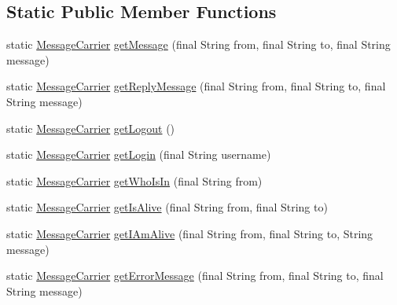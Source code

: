 \subsection*{Static Public Member Functions}
\begin{DoxyCompactItemize}
\item 
static \hyperlink{classgov_1_1fnal_1_1ppd_1_1dd_1_1chat_1_1MessageCarrier}{Message\-Carrier} \hyperlink{classgov_1_1fnal_1_1ppd_1_1dd_1_1chat_1_1MessageCarrier_a4c4efc24412a6390b9ddc6a002c42855}{get\-Message} (final String from, final String to, final String message)
\item 
static \hyperlink{classgov_1_1fnal_1_1ppd_1_1dd_1_1chat_1_1MessageCarrier}{Message\-Carrier} \hyperlink{classgov_1_1fnal_1_1ppd_1_1dd_1_1chat_1_1MessageCarrier_a0b3d0cac46ac4c642045a98e78a5d541}{get\-Reply\-Message} (final String from, final String to, final String message)
\item 
static \hyperlink{classgov_1_1fnal_1_1ppd_1_1dd_1_1chat_1_1MessageCarrier}{Message\-Carrier} \hyperlink{classgov_1_1fnal_1_1ppd_1_1dd_1_1chat_1_1MessageCarrier_a58cfc7579e97952714838a1a69488a3e}{get\-Logout} ()
\item 
static \hyperlink{classgov_1_1fnal_1_1ppd_1_1dd_1_1chat_1_1MessageCarrier}{Message\-Carrier} \hyperlink{classgov_1_1fnal_1_1ppd_1_1dd_1_1chat_1_1MessageCarrier_aaa7970bd6d632f5e2e56884fd2e5d528}{get\-Login} (final String username)
\item 
static \hyperlink{classgov_1_1fnal_1_1ppd_1_1dd_1_1chat_1_1MessageCarrier}{Message\-Carrier} \hyperlink{classgov_1_1fnal_1_1ppd_1_1dd_1_1chat_1_1MessageCarrier_ab7af24fd90518abf7a0facac05d64b3e}{get\-Who\-Is\-In} (final String from)
\item 
static \hyperlink{classgov_1_1fnal_1_1ppd_1_1dd_1_1chat_1_1MessageCarrier}{Message\-Carrier} \hyperlink{classgov_1_1fnal_1_1ppd_1_1dd_1_1chat_1_1MessageCarrier_a04ca970aa1904aed4189a72a2109e76d}{get\-Is\-Alive} (final String from, final String to)
\item 
static \hyperlink{classgov_1_1fnal_1_1ppd_1_1dd_1_1chat_1_1MessageCarrier}{Message\-Carrier} \hyperlink{classgov_1_1fnal_1_1ppd_1_1dd_1_1chat_1_1MessageCarrier_ad3ae47a06a161739da95be215dd7781a}{get\-I\-Am\-Alive} (final String from, final String to, String message)
\item 
static \hyperlink{classgov_1_1fnal_1_1ppd_1_1dd_1_1chat_1_1MessageCarrier}{Message\-Carrier} \hyperlink{classgov_1_1fnal_1_1ppd_1_1dd_1_1chat_1_1MessageCarrier_a7b99547dc0124d5ae6d197f31c55effd}{get\-Error\-Message} (final String from, final String to, final String message)

\end{DoxyCompactItemize}
